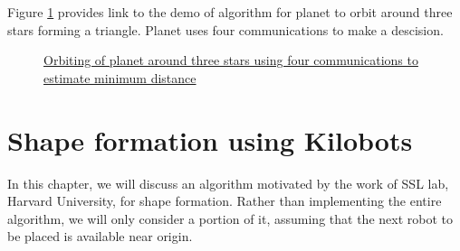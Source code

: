 \documentclass{report}[12pt]
\begin{document}
Figure \ref{fig:orbit_three_stars} provides link to the demo of algorithm for planet to orbit around three stars forming a triangle. Planet uses four communications to make a descision.
\begin{figure}[H]
	\centering
	\caption{\href{https://youtu.be/5aZm0Os9BPc}{Orbiting of planet around three stars using four communications to estimate minimum distance}}
	\label{fig:orbit_three_stars}
\end{figure}

\chapter{Shape formation using Kilobots}
In this chapter, we will discuss an algorithm motivated by the work \cite{MR-AC-RN:2014} of SSL lab, Harvard University, for shape formation. Rather than implementing the entire algorithm, we will only consider a portion of it, assuming that the next robot to be placed is available near origin.
\end{document}
